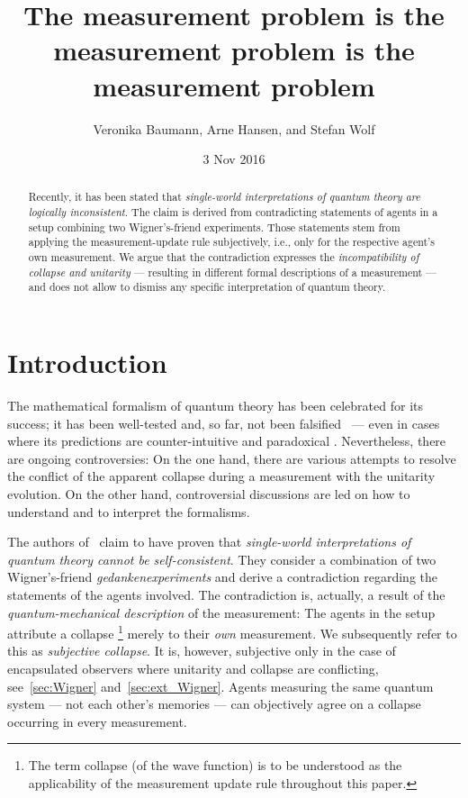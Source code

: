 \documentclass[aps,pra,12pt]{revtex4-2}
\theoremstyle{definition}
\theoremstyle{remark}
\begin{document}
\date{3 Nov 2016}

\title{The measurement problem is the measurement problem is the measurement problem} 
\author{Veronika Baumann, Arne Hansen, and Stefan Wolf}

\begin{abstract}
\noindent
Recently, it has been stated that {\em single-world interpretations of quantum theory are logically inconsistent\/}. 
The claim is derived from contradicting statements of agents in a setup combining two Wigner's-friend experiments.
Those statements stem from applying the measurement-update rule subjectively, i.e., only for the respective agent's own measurement.
We argue that the contradiction expresses the {\em incompatibility of collapse and unitarity\/} --- resulting in different formal descriptions of a measurement --- and does not allow to dismiss any specific interpretation of quantum theory. 
\end{abstract}

\maketitle

\newpage
\section{Introduction}
\noindent

The mathematical formalism of quantum theory has been celebrated for its success; it has been well-tested and, so far, not been falsified~\cite{Popper1934} --- even in cases where its predictions are counter-intuitive and paradoxical \cite{aspect1982experimental,bouwmeester1997experimental,stefanov2002quantum,ma2012experimental,denkmayr2014observation}. 
Nevertheless, there are ongoing controversies: On the one hand, there are various attempts to resolve the conflict of the apparent collapse during a measurement with the unitarity evolution. 
On the other hand, controversial discussions are led on how to understand and to interpret the formalisms. 

The authors of~\cite{FrRen} claim to have proven that \emph{single-world interpretations of quantum theory cannot be self-consistent}. 
They consider a combination of two Wigner's-friend \emph{gedankenexperiments} and derive a contradiction regarding the statements of the agents involved. 
The contradiction is, actually, a result of the \emph{quantum-mechanical description} of the measurement:
The agents in the setup attribute a collapse \footnote{The term collapse (of the wave function) is to be understood as the applicability of the measurement update rule throughout this paper.} merely to their \emph{own} measurement. 
We subsequently refer to this as \emph{subjective collapse}. 
It is, however, subjective only in the case of encapsulated observers where unitarity and collapse are conflicting, see~\ref{sec:Wigner} and~\ref{sec:ext_Wigner}. 
Agents measuring the same quantum system --- not each other's memories --- can objectively agree on a collapse occurring in every measurement.
\end{document}
